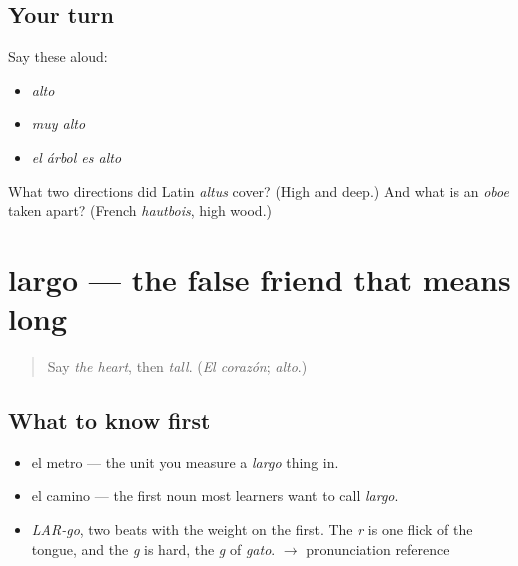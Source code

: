 \subsection*{Your turn}
Say these aloud:

\begin{itemize}
\raggedright
  \item \emph{alto}
  \item \emph{muy alto}
  \item \emph{el árbol es alto}
\end{itemize}

\begin{tcolorbox}[breakable,colback=teal!4,colframe=teal!35!black,title={Before you move on}]
What two directions did Latin \emph{altus} cover? (High and deep.) And what is an \emph{oboe} taken apart? (French \emph{hautbois}, high wood.)
\end{tcolorbox}
\section[largo]{largo — the false friend that means long}

\label{lesson:ES-C365-largo}



\begin{quote}
Say \emph{the heart}, then \emph{tall}. (\emph{El corazón}; \emph{alto}.)
\end{quote}

\subsection*{What to know first}
\begin{itemize}
\raggedright
  \item el metro — the unit you measure a \emph{largo} thing in.
  \item el camino — the first noun most learners want to call \emph{largo}.
\end{itemize}

\begin{sounds}
\begin{itemize}
\raggedright
  \item \emph{LAR-go}, two beats with the weight on the first. The \emph{r} is one flick of the tongue, and the \emph{g} is hard, the \emph{g} of \emph{gato}. $\to$ pronunciation reference
\end{itemize}
\end{sounds}

